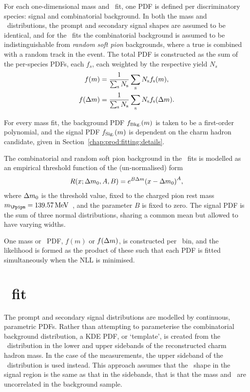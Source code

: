 For each one-dimensional mass and \deltam\ fit, one PDF is defined per 
discriminatory species: signal and combinatorial background.
In both the mass and \deltam\ distributions, the prompt and secondary signal 
shapes are assumed to be identical, and for the \deltam\ fits the combinatorial 
background is assumed to be indistinguishable from \emph{random soft pion} 
backgrounds, where a true \PDzero is combined with a random track in the event.
The total \ac{PDF} is constructed as the sum of the per-species \acp{PDF}, each $f_{s}$, 
each weighted by the respective yield $N_{s}$
\begin{align}
  f(m) &= \frac{1}{\sum_{\textnormal{s}} N_{\textnormal{s}}}
          \sum_{\textnormal{s}} N_{\textnormal{s}}
          f_{\textnormal{s}}(m),\\
  f(\Delta{m}) &= \frac{1}{\sum_{\textnormal{s}} N_{\textnormal{s}}}
                \sum_{\textnormal{s}} N_{\textnormal{s}}
                f_{\textnormal{s}}(\Delta{m}).
\end{align}

For every mass fit, the background PDF $f_{\textnormal{Bkg.}}(m)$ is taken to 
be a first-order polynomial, and the signal PDF $f_{\textnormal{Sig.}}(m)$ is 
dependent on the charm hadron candidate, given in 
Section~\ref{chap:prod:fitting:details}.

The combinatorial and random soft pion background in the \deltam\ fits is 
modelled as an empirical threshold function of the (un-normalised) form
\begin{equation}
  R(x; \Delta{m}_{0}, A, B) = e^{B\Delta{m}}
    {(x - \Delta{m}_{0})}^A,
\end{equation}
where $\Delta{m}_{0}$ is the threshold value, fixed to the charged pion rest mass 
$m_{\Ppipm} = \SI{139.57}{\MeV}$~\cite{PDG2014}, and the parameter $B$ is fixed 
to zero.
The signal PDF is the sum of three normal distributions, sharing a common mean 
but allowed to have varying widths.

One mass or \deltam\ PDF, $f(m)$ or $f(\Delta{m})$, is constructed per \pTy\ bin, 
and the likelihood is formed as the product of these such that each PDF is 
fitted simultaneously when the \ac{NLL} is minimised.

\section{\lnipchisq\ fit}
\label{chap:prod:fitting:ipchisq}

The prompt and secondary signal distributions are modelled by continuous, 
parametric \acp{PDF}.
Rather than attempting to parameterise the combinatorial background 
distribution, a \acf{KDE} \ac{PDF}, or `template', is created from the 
\lnipchisq\ distribution in the lower and upper sidebands of the reconstructed 
charm hadron mass.
In the case of the \PDstarp measurements, the upper sideband of the \deltam\ 
distribution is used instead.
This approach assumes that the \lnipchisq\ shape in the signal region is the 
same as that in the sidebands, that is that the mass and \lnipchisq\ are 
uncorrelated in the background sample.

